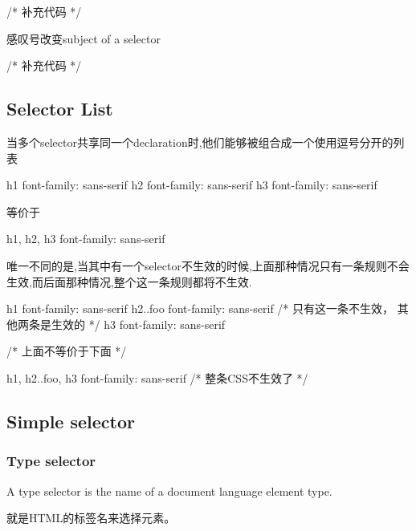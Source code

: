 \begin{CSS}
/* 补充代码 */
\end{CSS}

感叹号改变subject of a selector

\begin{CSS}
/* 补充代码 */
\end{CSS}

\subsection{Selector List}

当多个selector共享同一个declaration时,他们能够被组合成一个使用逗号分开的列表

\begin{CSS}
h1 { font-family: sans-serif }
h2 { font-family: sans-serif }
h3 { font-family: sans-serif }
\end{CSS}

等价于

\begin{CSS}

h1, h2, h3 { font-family: sans-serif }

\end{CSS}


唯一不同的是,当其中有一个selector不生效的时候,上面那种情况只有一条规则不会生效,而后面那种情况,整个这一条规则都将不生效.

\begin{CSS}

h1 { font-family: sans-serif }
h2..foo { font-family: sans-serif } /* 只有这一条不生效， 其他两条是生效的 */
h3 { font-family: sans-serif }


/* 上面不等价于下面 */

h1, h2..foo, h3 { font-family: sans-serif } /* 整条CSS不生效了 */


\end{CSS}


\subsection{Simple selector}



\subsubsection{Type selector}

A type selector is the name of a document language element type.

就是HTML的标签名来选择元素。

